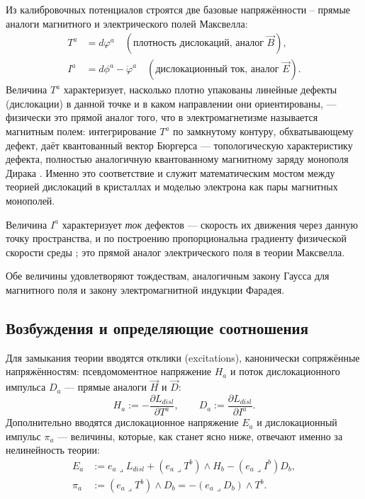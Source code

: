 \documentclass[12pt,a4paper]{article}
\begin{document}
Из калибровочных потенциалов строятся две базовые напряжённости --
прямые аналоги магнитного и электрического полей Максвелла:
\begin{align}
T^a &= d\varphi^a \quad(\text{плотность дислокаций, аналог } \vec B),\\
I^a &= d\phi^a-\dot\varphi^a \quad(\text{дислокационный ток, аналог } \vec E).
\end{align}
Величина $T^a$ характеризует, насколько плотно упакованы линейные
дефекты (дислокации) в данной точке и в каком направлении они
ориентированы, --- физически это прямой аналог того, что в
электромагнетизме называется магнитным полем: интегрирование $T^a$ по
замкнутому контуру, обхватывающему дефект, даёт квантованный вектор
Бюргерса --- топологическую характеристику дефекта, полностью
аналогичную квантованному магнитному заряду монополя Дирака
\cite{Lazar2010}. Именно это соответствие и служит математическим
мостом между теорией дислокаций в кристаллах и моделью электрона как
пары магнитных монополей.

Величина $I^a$ характеризует \emph{ток} дефектов --- скорость их
движения через данную точку пространства, и по построению
пропорциональна градиенту физической скорости среды \cite{Lazar2010};
это прямой аналог электрического поля в теории Максвелла.

Обе величины удовлетворяют тождествам, аналогичным закону Гаусса для
магнитного поля и закону электромагнитной индукции Фарадея.

\subsection{Возбуждения и определяющие соотношения}

Для замыкания теории вводятся отклики (excitations), канонически
сопряжённые напряжённостям: псевдомоментное напряжение $H_a$ и поток
дислокационного импульса $D_a$ --- прямые аналоги $\vec H$ и $\vec D$:
\begin{equation}
H_a := -\frac{\partial L_{disl}}{\partial T^a},\qquad
D_a := \frac{\partial L_{disl}}{\partial I^a}.
\end{equation}
Дополнительно вводятся дислокационное напряжение $E_a$ и
дислокационный импульс $\pi_a$ --- величины, которые, как станет ясно
ниже, отвечают именно за нелинейность теории:
\begin{align}
E_a &:= e_a\lrcorner L_{disl} + (e_a\lrcorner T^b)\wedge H_b
- (e_a\lrcorner I^b) D_b,\\
\pi_a &:= (e_a\lrcorner T^b)\wedge D_b = -(e_a\lrcorner D_b)\wedge T^b.
\end{align}
\end{document}
